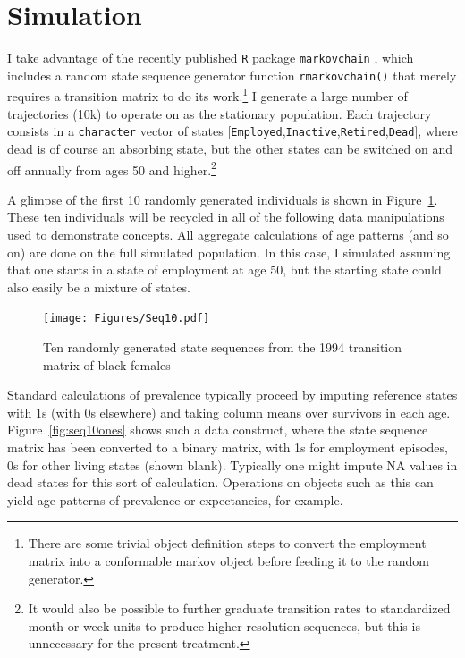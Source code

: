 \documentclass{article}
\begin{document}
\section{Simulation}
I take advantage of the recently published \texttt{R} package
\texttt{markovchain} \citep{spedicato2017}, which includes a random state
sequence generator function \texttt{rmarkovchain()} that merely requires a
transition matrix to do its work.\footnote{There are some trivial object
definition steps to convert the employment matrix into a conformable markov
object before feeding it to the random generator.} I generate a large number of
trajectories (10k) to operate on as the stationary population. Each
trajectory consists in a \texttt{character} vector of states
[\texttt{Employed},\texttt{Inactive},\texttt{Retired},\texttt{Dead}], where dead
is of course an absorbing state, but the other states can be switched on and off
annually from ages 50 and higher.\footnote{It would also be possible to further
graduate transition rates to standardized month or week units to produce higher
resolution sequences, but this is unnecessary for the present treatment.}

A glimpse of the first 10 randomly generated individuals is shown in
Figure~\ref{fig:seq10}. These ten individuals will be recycled in all of the
following data manipulations used to demonstrate concepts. All aggregate
calculations of age patterns (and so on) are done on the full simulated population. In this case, I simulated
assuming that one starts in a state of employment at age 50, but the starting
state could also easily be a mixture of states.

\begin{figure}[ht!]
\centering
\caption{Ten randomly generated state sequences from the 1994 transition matrix
of black females \citep{Dudel2017}}
\label{fig:seq10}
\texttt{[image: Figures/Seq10.pdf]}
\end{figure}

Standard calculations of prevalence typically proceed by imputing reference
states with 1s (with 0s elsewhere) and taking column means over survivors in
each age. Figure~\ref{fig:seq10ones} shows such a data construct, where the
state sequence matrix has been converted to a binary matrix, with 1s for
employment episodes, 0s for other living states (shown blank). Typically one
might impute NA values in dead states for this sort of calculation. Operations on
objects such as this can yield age patterns of prevalence or
expectancies, for example.
\end{document}
